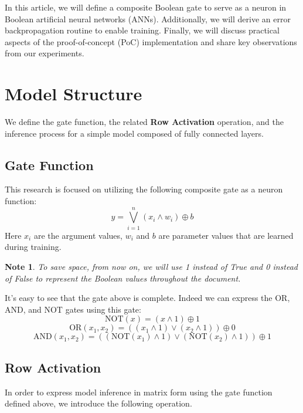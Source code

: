\documentclass[pmlr]{jmlr}
\newtheorem*{note}{Note}
\begin{document}
In this article, we will define a composite Boolean gate to serve as a neuron in Boolean artificial neural networks (ANNs). Additionally, we will derive an error backpropagation routine to enable training. Finally, we will discuss practical aspects of the proof-of-concept (PoC) implementation and share key observations from our experiments.

\section{Model Structure}
We define the gate function, the related \textbf{Row Activation} operation, and the inference process for a simple model composed of fully connected layers.

\subsection{Gate Function}
This research is focused on utilizing the following composite gate as a neuron function:
\[ y = \bigvee_{i=1}^{n} \left( x_{i} \wedge w_{i} \right) \oplus b \]
Here \( x_{i} \) are the argument values, \( w_{i} \) and \( b \) are parameter values that are learned during training.

\begin{note}
    To save space, from now on, we will use 1 instead of True and 0 instead of False to represent the Boolean values throughout the document.
\end{note}

It's easy to see that the gate above is complete. Indeed we can express the OR, AND, and NOT gates using this gate:
\[ \text{NOT}(x) = \left( x \wedge 1 \right) \oplus 1 \]
\[ \text{OR}(x_1, x_2) = \left( \left( x_1 \wedge 1 \right) \vee \left( x_2 \wedge 1 \right) \right) \oplus 0 \]
\[ \text{AND}(x_1, x_2) = \left( \left( \text{NOT}(x_1) \wedge 1 \right) \vee \left( \text{NOT}(x_2) \wedge 1 \right) \right) \oplus 1 \]

\subsection{Row Activation}
In order to express model inference in matrix form using the gate function defined above, we introduce the following operation.
\end{document}
